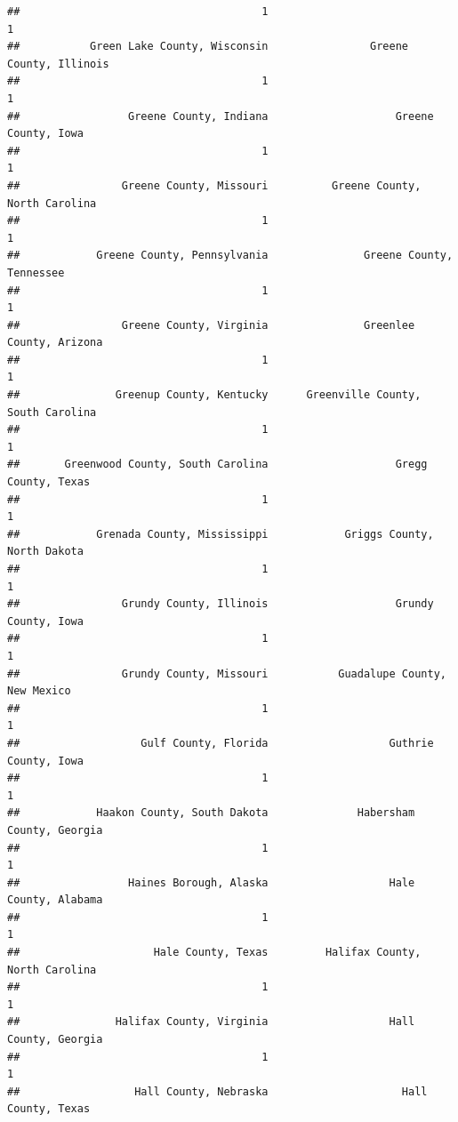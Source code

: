 \documentclass[
]{article}
\begin{document}
\begin{verbatim}
##                                      1                                      1 
##           Green Lake County, Wisconsin                Greene County, Illinois 
##                                      1                                      1 
##                 Greene County, Indiana                    Greene County, Iowa 
##                                      1                                      1 
##                Greene County, Missouri          Greene County, North Carolina 
##                                      1                                      1 
##            Greene County, Pennsylvania               Greene County, Tennessee 
##                                      1                                      1 
##                Greene County, Virginia               Greenlee County, Arizona 
##                                      1                                      1 
##               Greenup County, Kentucky      Greenville County, South Carolina 
##                                      1                                      1 
##       Greenwood County, South Carolina                    Gregg County, Texas 
##                                      1                                      1 
##            Grenada County, Mississippi            Griggs County, North Dakota 
##                                      1                                      1 
##                Grundy County, Illinois                    Grundy County, Iowa 
##                                      1                                      1 
##                Grundy County, Missouri           Guadalupe County, New Mexico 
##                                      1                                      1 
##                   Gulf County, Florida                   Guthrie County, Iowa 
##                                      1                                      1 
##            Haakon County, South Dakota              Habersham County, Georgia 
##                                      1                                      1 
##                 Haines Borough, Alaska                   Hale County, Alabama 
##                                      1                                      1 
##                     Hale County, Texas         Halifax County, North Carolina 
##                                      1                                      1 
##               Halifax County, Virginia                   Hall County, Georgia 
##                                      1                                      1 
##                  Hall County, Nebraska                     Hall County, Texas 

\end{verbatim}
\end{document}

